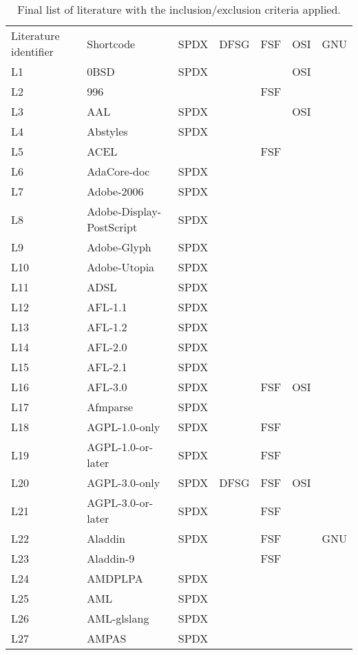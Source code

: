 
\begin{longtable}[h]{m{2cm} | m{7cm} | c | c | c | c | c}
  \caption{Final list of literature with the inclusion/exclusion criteria applied.} \label{table:appendix:a} \\
  \hline
  Literature identifier & Shortcode & SPDX & DFSG & FSF & OSI & GNU \\
L1 & 0BSD & SPDX &  &  & OSI &  \\
L2 & 996 &  &  & FSF &  &  \\
L3 & AAL & SPDX &  &  & OSI &  \\
L4 & Abstyles & SPDX &  &  &  &  \\
L5 & ACEL &  &  & FSF &  &  \\
L6 & AdaCore-doc & SPDX &  &  &  &  \\
L7 & Adobe-2006 & SPDX &  &  &  &  \\
L8 & Adobe-Display-PostScript & SPDX &  &  &  &  \\
L9 & Adobe-Glyph & SPDX &  &  &  &  \\
L10 & Adobe-Utopia & SPDX &  &  &  &  \\
L11 & ADSL & SPDX &  &  &  &  \\
L12 & AFL-1.1 & SPDX &  &  &  &  \\
L13 & AFL-1.2 & SPDX &  &  &  &  \\
L14 & AFL-2.0 & SPDX &  &  &  &  \\
L15 & AFL-2.1 & SPDX &  &  &  &  \\
L16 & AFL-3.0 & SPDX &  & FSF & OSI &  \\
L17 & Afmparse & SPDX &  &  &  &  \\
L18 & AGPL-1.0-only & SPDX &  & FSF &  &  \\
L19 & AGPL-1.0-or-later & SPDX &  & FSF &  &  \\
L20 & AGPL-3.0-only & SPDX & DFSG & FSF & OSI &  \\
L21 & AGPL-3.0-or-later & SPDX &  & FSF &  &  \\
L22 & Aladdin & SPDX &  & FSF &  & GNU \\
L23 & Aladdin-9 &  &  & FSF &  &  \\
L24 & AMDPLPA & SPDX &  &  &  &  \\
L25 & AML & SPDX &  &  &  &  \\
L26 & AML-glslang & SPDX &  &  &  &  \\
L27 & AMPAS & SPDX &  &  &  &  \\

\end{longtable}

